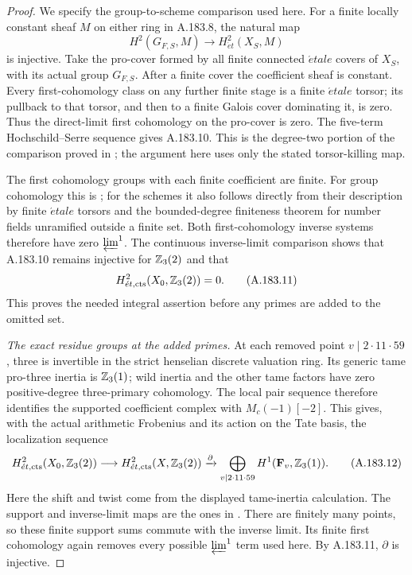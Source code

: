 \begin{proof}
We specify the group-to-scheme comparison used here.
For a finite locally constant sheaf \(M\) on either ring in
A.183.8, the natural map
\[
 H^2(G_{F,S},M)\longrightarrow H^2_{\acute et}(X_S,M)
\tag{A.183.10}
\]
is injective.  Take the pro-cover formed by all finite
connected \(\acute etale\) covers of \(X_S\), with its actual
group \(G_{F,S}\).  After a finite cover the coefficient sheaf
is constant.  Every first-cohomology class on any further
finite stage is a finite \(\acute etale\) torsor; its pullback
to that torsor, and then to a finite Galois cover dominating
it, is zero.  Thus the direct-limit first cohomology on the
pro-cover is zero.  The five-term Hochschild--Serre sequence
gives A.183.10.  This is the degree-two portion of the
comparison proved in
\cite[II, Proposition 2.9 and its proof]{BIR_MilneADT};
the argument here uses only the stated torsor-killing map.

The first cohomology groups with each finite coefficient are
finite.  For group cohomology this is
\cite[I, Corollary 4.15]{BIR_MilneADT}; for the schemes it also
follows directly from their description by finite \(\acute etale\)
torsors and the bounded-degree finiteness theorem for number
fields unramified outside a finite set.
Both first-cohomology inverse systems therefore have zero
\(\varprojlim^1\).  The continuous inverse-limit comparison
\cite[(1.6), (2.1), Theorem (2.2), and (3.1)]{BIR_Jannsen1988}
shows that A.183.10 remains injective for \(\mathbb Z_3(2)\) and that
\[
 H^2_{\acute et,\mathrm{cts}}(X_0,\mathbb Z_3(2))=0.
\tag{A.183.11}
\]
This proves the needed integral assertion before any primes
are added to the omitted set.

\emph{The exact residue groups at the added primes.}
At each removed point \(v\mid2\cdot11\cdot59\), three is
invertible in the strict henselian discrete valuation ring.
Its generic tame pro-three inertia is \(\mathbb Z_3(1)\); wild
inertia and the other tame factors have zero positive-degree
three-primary cohomology.  The local pair sequence therefore
identifies the supported coefficient complex with
\(M_c(-1)[-2]\).  This gives, with the actual arithmetic
Frobenius and its action on the Tate basis, the localization
sequence
\[
 H^2_{\acute et,\mathrm{cts}}(X_0,\mathbb Z_3(2))
 \longrightarrow H^2_{\acute et,\mathrm{cts}}(X,\mathbb Z_3(2))
 \xrightarrow{\partial}
 \bigoplus_{v\mid2\cdot11\cdot59}
                     H^1(\mathbf F_v,\mathbb Z_3(1)).
\tag{A.183.12}
\]
Here the shift and twist come from the displayed tame-inertia
calculation.  The support and inverse-limit maps are the
ones in \cite[(3.6), (3.8), and (3.15)--(3.16)]{BIR_Jannsen1988}.
There are finitely many points, so these finite support sums
commute with the inverse limit.  Its finite first cohomology
again removes every possible \(\varprojlim^1\) term used here.
By A.183.11, \(\partial\) is injective.


\end{proof}
